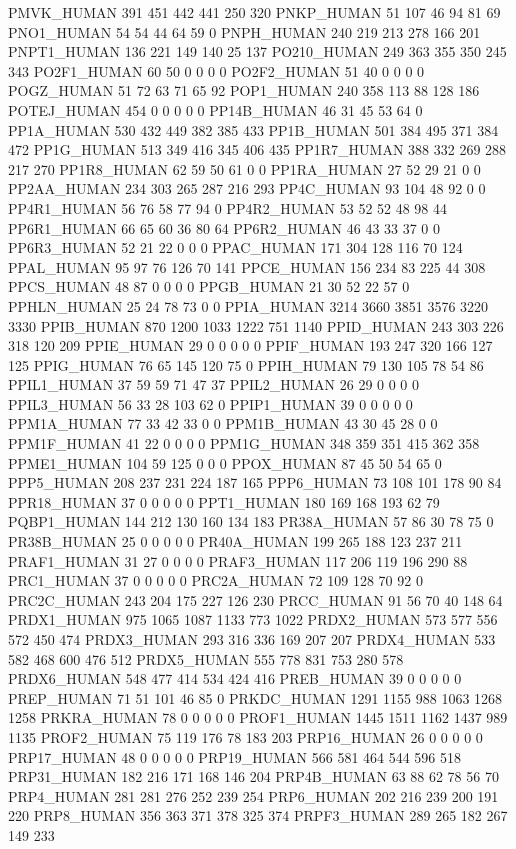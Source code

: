 PMVK_HUMAN	391	451	442	441	250	320
PNKP_HUMAN	51	107	46	94	81	69
PNO1_HUMAN	54	54	44	64	59	0
PNPH_HUMAN	240	219	213	278	166	201
PNPT1_HUMAN	136	221	149	140	25	137
PO210_HUMAN	249	363	355	350	245	343
PO2F1_HUMAN	60	50	0	0	0	0
PO2F2_HUMAN	51	40	0	0	0	0
POGZ_HUMAN	51	72	63	71	65	92
POP1_HUMAN	240	358	113	88	128	186
POTEJ_HUMAN	454	0	0	0	0	0
PP14B_HUMAN	46	31	45	53	64	0
PP1A_HUMAN	530	432	449	382	385	433
PP1B_HUMAN	501	384	495	371	384	472
PP1G_HUMAN	513	349	416	345	406	435
PP1R7_HUMAN	388	332	269	288	217	270
PP1R8_HUMAN	62	59	50	61	0	0
PP1RA_HUMAN	27	52	29	21	0	0
PP2AA_HUMAN	234	303	265	287	216	293
PP4C_HUMAN	93	104	48	92	0	0
PP4R1_HUMAN	56	76	58	77	94	0
PP4R2_HUMAN	53	52	52	48	98	44
PP6R1_HUMAN	66	65	60	36	80	64
PP6R2_HUMAN	46	43	33	37	0	0
PP6R3_HUMAN	52	21	22	0	0	0
PPAC_HUMAN	171	304	128	116	70	124
PPAL_HUMAN	95	97	76	126	70	141
PPCE_HUMAN	156	234	83	225	44	308
PPCS_HUMAN	48	87	0	0	0	0
PPGB_HUMAN	21	30	52	22	57	0
PPHLN_HUMAN	25	24	78	73	0	0
PPIA_HUMAN	3214	3660	3851	3576	3220	3330
PPIB_HUMAN	870	1200	1033	1222	751	1140
PPID_HUMAN	243	303	226	318	120	209
PPIE_HUMAN	29	0	0	0	0	0
PPIF_HUMAN	193	247	320	166	127	125
PPIG_HUMAN	76	65	145	120	75	0
PPIH_HUMAN	79	130	105	78	54	86
PPIL1_HUMAN	37	59	59	71	47	37
PPIL2_HUMAN	26	29	0	0	0	0
PPIL3_HUMAN	56	33	28	103	62	0
PPIP1_HUMAN	39	0	0	0	0	0
PPM1A_HUMAN	77	33	42	33	0	0
PPM1B_HUMAN	43	30	45	28	0	0
PPM1F_HUMAN	41	22	0	0	0	0
PPM1G_HUMAN	348	359	351	415	362	358
PPME1_HUMAN	104	59	125	0	0	0
PPOX_HUMAN	87	45	50	54	65	0
PPP5_HUMAN	208	237	231	224	187	165
PPP6_HUMAN	73	108	101	178	90	84
PPR18_HUMAN	37	0	0	0	0	0
PPT1_HUMAN	180	169	168	193	62	79
PQBP1_HUMAN	144	212	130	160	134	183
PR38A_HUMAN	57	86	30	78	75	0
PR38B_HUMAN	25	0	0	0	0	0
PR40A_HUMAN	199	265	188	123	237	211
PRAF1_HUMAN	31	27	0	0	0	0
PRAF3_HUMAN	117	206	119	196	290	88
PRC1_HUMAN	37	0	0	0	0	0
PRC2A_HUMAN	72	109	128	70	92	0
PRC2C_HUMAN	243	204	175	227	126	230
PRCC_HUMAN	91	56	70	40	148	64
PRDX1_HUMAN	975	1065	1087	1133	773	1022
PRDX2_HUMAN	573	577	556	572	450	474
PRDX3_HUMAN	293	316	336	169	207	207
PRDX4_HUMAN	533	582	468	600	476	512
PRDX5_HUMAN	555	778	831	753	280	578
PRDX6_HUMAN	548	477	414	534	424	416
PREB_HUMAN	39	0	0	0	0	0
PREP_HUMAN	71	51	101	46	85	0
PRKDC_HUMAN	1291	1155	988	1063	1268	1258
PRKRA_HUMAN	78	0	0	0	0	0
PROF1_HUMAN	1445	1511	1162	1437	989	1135
PROF2_HUMAN	75	119	176	78	183	203
PRP16_HUMAN	26	0	0	0	0	0
PRP17_HUMAN	48	0	0	0	0	0
PRP19_HUMAN	566	581	464	544	596	518
PRP31_HUMAN	182	216	171	168	146	204
PRP4B_HUMAN	63	88	62	78	56	70
PRP4_HUMAN	281	281	276	252	239	254
PRP6_HUMAN	202	216	239	200	191	220
PRP8_HUMAN	356	363	371	378	325	374
PRPF3_HUMAN	289	265	182	267	149	233
